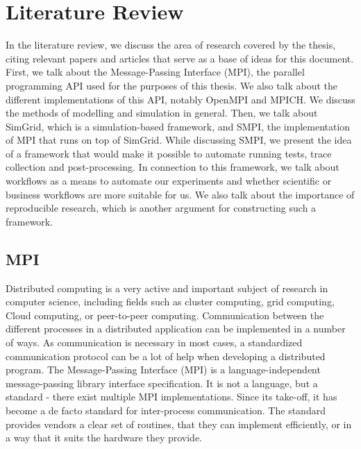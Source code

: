 
\chapter{Literature Review}
\label{Chapter2}

In the literature review, we discuss the area of research covered by
the thesis, citing relevant papers and articles that serve as a base
of ideas for this document.\\[0.3cm]
First, we talk about the Message-Passing Interface (MPI), the parallel
programming API used for the purposes of this thesis. We also talk
about the different implementations of this API, notably OpenMPI and
MPICH. We discuss the methods of modelling and simulation in general.
Then, we talk about SimGrid, which is a simulation-based
framework, and SMPI, the implementation of MPI that runs on top of
SimGrid. While discussing SMPI, we present the idea of a framework
that would make it possible to automate running tests, trace
collection and post-processing. In connection to this framework, we
talk about workflows as a means to automate our experiments and
whether scientific or business workflows are more suitable for
us. We also talk about the importance of reproducible research, which
is another argument for constructing such a framework.
\section{MPI}
Distributed computing is a very active and important subject of research
in computer science, including fields such as cluster computing, grid
computing, Cloud computing, or peer-to-peer computing. Communication
between the different processes in a distributed application can be
implemented in a number of ways. As communication is necessary in most
cases, a standardized communication protocol can be a lot of help when
developing a distributed program. The Message-Passing Interface (MPI)
is a language-independent message-passing library
interface specification. It is not a language, but a standard - there
exist multiple MPI implementations. Since its take-off, it has become
a de facto standard for inter-process communication. The standard
provides vendors a clear set of routines, that they can implement
efficiently, or in a way that it suits the hardware they
provide.\cite{mpif12}
